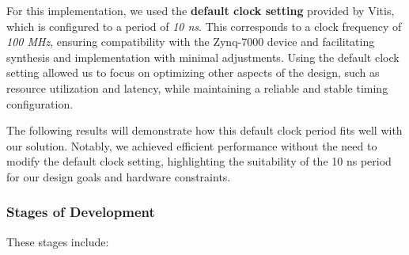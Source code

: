 \documentclass{article}
\begin{document}
For this implementation, we used the \textbf{default clock setting} provided by Vitis, which is configured to a period of \textit{10 ns}. This corresponds to a clock frequency of \textit{100 MHz}, ensuring compatibility with the Zynq-7000 device and facilitating synthesis and implementation with minimal adjustments. Using the default clock setting allowed us to focus on optimizing other aspects of the design, such as resource utilization and latency, while maintaining a reliable and stable timing configuration.

The following results will demonstrate how this default clock period fits well with our solution. Notably, we achieved efficient performance without the need to modify the default clock setting, highlighting the suitability of the 10 ns period for our design goals and hardware constraints.


\subsubsection{Stages of Development}
These stages include:
\end{document}
